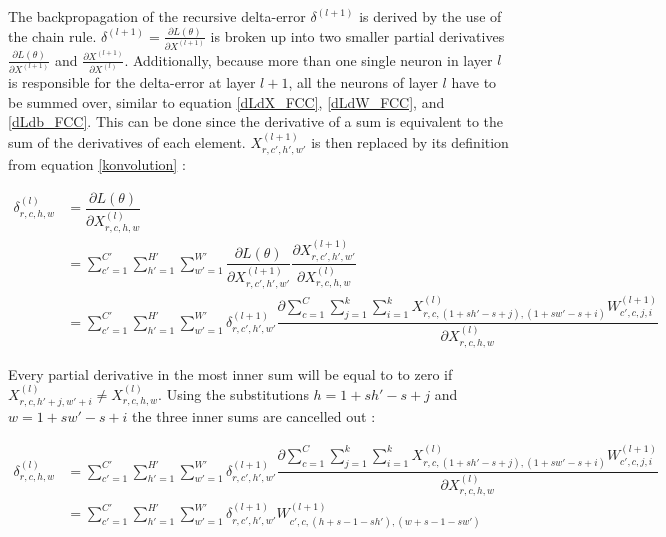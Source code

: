 \documentclass[a4paper, twoside]{article}
\newcommand*{\pd}[2]{\ensuremath{\dfrac{\partial #1}{\partial #2}}}
\newcommand*{\inpd}[2]{\ensuremath{\frac{\partial #1}{\partial #2}}}
\begin{document}
The backpropagation of the recursive delta-error $\delta^{(l+1)}$ is derived by the use of the chain rule. $\delta^{(l+1)} = \inpd{L(\theta)}{X^{(l+1)}}$ is broken up into two smaller partial derivatives $\inpd{L(\theta)}{X^{(l+1)}}$ and $\inpd{X^{(l+1)}}{X^{(l)}}$. Additionally, because more than one single neuron in layer $l$ is responsible for the delta-error at layer $l+1$, all the neurons of layer $l$ have to be summed over, similar to equation \eqref{dLdX_FCC}, \eqref{dLdW_FCC}, and \eqref{dLdb_FCC}. This can be done since the derivative of a sum is equivalent to the sum of the derivatives of each element. $X^{(l+1)}_{r,c',h',w'}$ is then replaced by its definition from equation \eqref{konvolution} \cite{convmath} \cite{webconv1} \cite{webconv2} \cite{webconv3}: 

\begin{equation}\label{konvolutionbackprop}
\begin{split}
	\delta^{(l)}_{r,c,h,w}
		& = \pd{L(\theta)}{X^{(l)}_{r,c,h,w}} \\
		& = \sum^{C' }_{c'=1} \sum^{H' }_{h'=1} \sum^{W' }_{w'=1} \pd{L(\theta)}{X^{(l+1)}_{r,c',h',w'}} \pd{X^{(l+1)}_{r,c',h',w'}}{X^{(l)}_{r,c,h,w}} \\
		& = \sum^{C' }_{c'=1} \sum^{H' }_{h'=1} \sum^{W' }_{w'=1} \delta^{(l+1)}_{r,c',h',w'} \pd{\sum^{C }_{c=1} \sum^{k }_{j=1} \sum^{k }_{i=1} X^{(l)}_{r, c, (1+sh'-s+j), (1+sw'-s+i)}W^{(l+1)}_{c', c, j, i}}{X^{(l)}_{r,c,h,w}}
\end{split}
\end{equation}

Every partial derivative in the most inner sum will be equal to to zero if $X^{(l)}_{r, c, h'+j, w'+i} \neq X^{(l)}_{r,c,h,w}$. Using the substitutions $h = 1+sh'-s+j$ and $w = 1+sw'-s+i$ the three inner sums are cancelled out \cite{webconv1} \cite{webconv2} \cite{webconv3}:

\begin{equation}
\begin{split}
	\delta^{(l)}_{r,c,h,w}
		& = \sum^{C' }_{c'=1} \sum^{H' }_{h'=1} \sum^{W' }_{w'=1} \delta^{(l+1)}_{r,c',h',w'} \pd{\sum^{C }_{c=1} \sum^{k }_{j=1} \sum^{k }_{i=1} X^{(l)}_{r, c, (1+sh'-s+j), (1+sw'-s+i)}W^{(l+1)}_{c', c, j, i}}{X^{(l)}_{r,c,h,w}} \\
		& = \sum^{C' }_{c'=1} \sum^{H' }_{h'=1} \sum^{W' }_{w'=1} \delta^{(l+1)}_{r,c',h',w'} W^{(l+1)}_{c', c, (h+s-1-sh'), (w+s-1-sw')}     \\
\end{split}
\end{equation}
\end{document}
